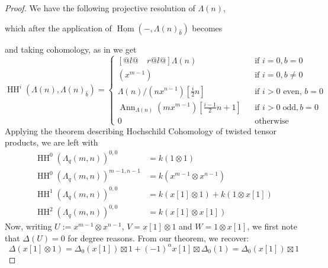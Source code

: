 \documentclass{article}
\newcommand{\HH}{\operatorname{HH}}
\theoremstyle{plain}
\theoremstyle{definition}
\begin{document}
\begin{proof}
 We have the following projective resolution of $\Lambda(n)$,
\begin{center}
\end{center}
which after the application of $\operatorname{Hom}(-,\Lambda(n)_{\hat{b}})$ becomes
\begin{center}
\end{center}
and taking cohomology, as in \cite{BriggsWitherspoon} we get
$$\HH^i(\Lambda(n), \Lambda(n)_{\hat{b}}) = \begin{cases}[@{}l@{\quad}r@{}l@{}] \Lambda(n) & & \textrm{if } i=0, b=0 \\ (x^{m-1}) & &\textrm{if } i=0, b\not=0 \\ \Lambda(n)/(nx^{n-1})[\frac{i}{2}n] & & \textrm{if } i>0 \textrm{ even, } b=0 \\ \operatorname{Ann}_{\Lambda(n)}(mx^{m-1})[\frac{i-1}{2}n+1] & & \textrm{if } i>0 \;\textrm{odd}, b =0 \\ 0 & & \textrm{otherwise} \end{cases}$$
Applying the theorem describing Hochschild Cohomology of twisted tensor products, we are left with 
$$\begin{aligned}
\HH^0(\Lambda_q(m,n))^{0,0} &= k(1 \otimes 1) \\
\HH^0(\Lambda_q(m,n))^{m-1,n-1} &= k(x^{m-1} \otimes x^{n-1}) \\
\HH^1(\Lambda_q(m,n))^{0,0} &= k(x[1] \otimes 1) + k(1 \otimes x[1]) \\
\HH^2(\Lambda_q(m,n))^{0,0} &= k(x[1] \otimes x[1])
\end{aligned}$$	
Now, writing $U:= x^{m-1} \otimes x^{n-1}$, $V= x[1] \otimes 1$ and $W= 1\otimes x[1]$, we first note that $\Delta(U)=0$ for degree reasons. From our theorem, we recover:
$$\Delta(x[1]\otimes 1) = \Delta_0(x[1]) \boxtimes 1 + (-1)^\alpha x[1] \boxtimes \Delta_0(1) =\Delta_0(x[1]) \boxtimes 1$$

\end{proof}
\end{document}
